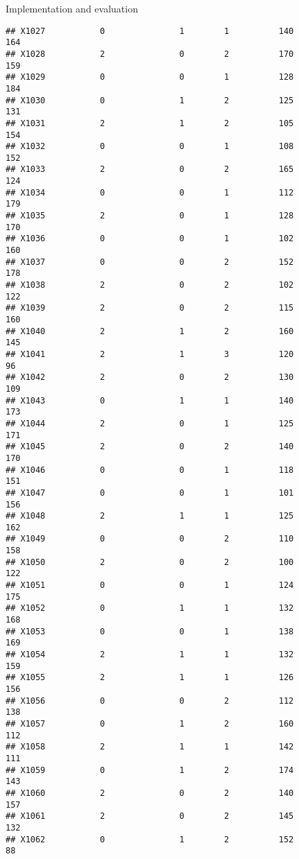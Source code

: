 \documentclass[
  ignorenonframetext,
]{beamer}
\begin{document}
\begin{frame}[fragile]{Implementation and evaluation}
\begin{verbatim}
## X1027           0               1        1          140            164
## X1028           2               0        2          170            159
## X1029           0               0        1          128            184
## X1030           0               1        2          125            131
## X1031           2               1        2          105            154
## X1032           0               0        1          108            152
## X1033           2               0        2          165            124
## X1034           0               0        1          112            179
## X1035           2               0        1          128            170
## X1036           0               0        1          102            160
## X1037           0               0        2          152            178
## X1038           2               0        2          102            122
## X1039           2               0        2          115            160
## X1040           2               1        2          160            145
## X1041           2               1        3          120             96
## X1042           2               0        2          130            109
## X1043           0               1        1          140            173
## X1044           2               0        1          125            171
## X1045           2               0        2          140            170
## X1046           0               0        1          118            151
## X1047           0               0        1          101            156
## X1048           2               1        1          125            162
## X1049           0               0        2          110            158
## X1050           2               0        2          100            122
## X1051           0               0        1          124            175
## X1052           0               1        1          132            168
## X1053           0               0        1          138            169
## X1054           2               1        1          132            159
## X1055           2               1        1          126            156
## X1056           0               0        2          112            138
## X1057           0               1        2          160            112
## X1058           2               1        1          142            111
## X1059           0               1        2          174            143
## X1060           2               0        2          140            157
## X1061           2               0        2          145            132
## X1062           0               1        2          152             88

\end{verbatim}
\end{frame}
\end{document}
